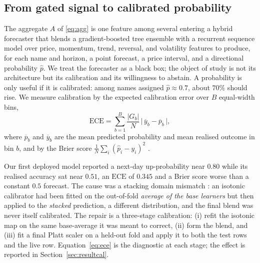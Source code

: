 \documentclass{elektr}
\begin{document}
\subsection{From gated signal to calibrated probability}
\label{sec:cal}
The aggregate $A$ of \eqref{eq:agg} is one feature among several entering a hybrid forecaster that blends a gradient-boosted tree ensemble with a recurrent sequence model over price, momentum, trend, reversal, and volatility features to produce, for each name and horizon, a point forecast, a price interval, and a directional probability $\hat p$. We treat the forecaster as a black box; the object of study is not its architecture but its calibration and its willingness to abstain. A probability is only useful if it is calibrated: among names assigned $\hat p\approx0.7$, about $70\%$ should rise. We measure calibration by the expected calibration error over $B$ equal-width bins,
\begin{equation}
\label{eq:ece}
\mathrm{ECE}=\sum_{b=1}^{B}\frac{|G_b|}{N}\,\big|\,\overline{y}_b-\overline{p}_b\,\big|,
\end{equation}
where $\overline{p}_b$ and $\overline{y}_b$ are the mean predicted probability and mean realised outcome in bin $b$, and by the Brier score $\frac1N\sum_i(\hat p_i-y_i)^2$ \cite{brier1950}.

Our first deployed model reported a next-day up-probability near $0.80$ while its realised accuracy sat near $0.51$, an $\mathrm{ECE}$ of $0.345$ and a Brier score worse than a constant $0.5$ forecast. The cause was a stacking domain mismatch \cite{wolpert1992}: an isotonic calibrator had been fitted on the out-of-fold \emph{average of the base learners} but then applied to the \emph{stacked} prediction, a different distribution, and the final blend was never itself calibrated. The repair is a three-stage calibration: (i) refit the isotonic map on the same base-average it was meant to correct, (ii) form the blend, and (iii) fit a final Platt scaler \cite{platt1999} on a held-out fold and apply it to both the test rows and the live row. Equation~\eqref{eq:ece} is the diagnostic at each stage; the effect is reported in Section~\ref{sec:resultcal}.
\end{document}
